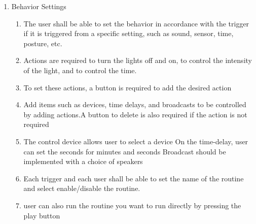 \begin{enumerate}[label=\arabic*.]
\begin{enumerate}[label*={\arabic*.}]
\begin{enumerate}[label*={\alph*.},ref=\theenumi.\arabic*]
\begin{enumerate}[label*={\arabic*.},ref=\theenumi.\arabic*]
                              \end{enumerate}

                    \end{enumerate}
              \item {\large{Behavior Settings}}\\

                    \begin{enumerate}[label*={\arabic*.},ref=\theenumi.\arabic*]
                        \setlength{\itemindent}{0.5cm}
                        \item The user shall be able to set the behavior in accordance with the trigger if it is triggered from a specific setting, such as sound, sensor, time, posture, etc.\\

                        \item Actions are required to turn the lights off and on, to control the intensity of the light, and to control the time.\\

                        \item To set these actions, a button is required to add the desired action
                              \\

                        \item Add items such as devices, time delays, and broadcasts to be controlled by adding actions.A button to delete is also required if the action is not required
                              \\

                        \item The control device allows user to select a device
                        On the time-delay, user can set the seconds for minutes and seconds Broadcast should be implemented with a choice of speakers
                              \\

                        \item Each trigger and each user shall be able to set the name of the routine and select enable/disable the routine.
                              \\

                        \item user can also run the routine you want to run directly by pressing the play button
                              \\
                    \end{enumerate}
          \end{enumerate}


\end{enumerate}
